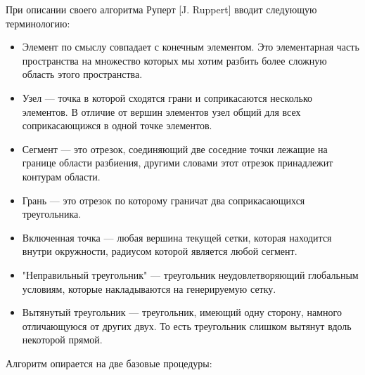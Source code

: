 \documentclass[14pt]{extreport}
\begin{document}
При описании своего алгоритма Руперт [J. Ruppert] вводит следующую терминологию:
\begin{itemize}
\item Элемент по смыслу совпадает с конечным элементом. Это элементарная часть пространства на множество которых мы хотим разбить более сложную область этого пространства.

\item Узел — точка в которой сходятся грани и соприкасаются несколько элементов. В отличие от вершин элементов узел общий для всех соприкасающижся в одной точке элементов.

\item Сегмент — это отрезок, соединяющий две соседние точки лежащие на границе области разбиения, другими словами этот отрезок принадлежит контурам области.

\item Грань — это отрезок по которому граничат два соприкасающихся треугольника.

\item Включенная точка — любая вершина текущей сетки, которая находится внутри окружности, радиусом которой является любой сегмент.

\item "Неправильный треугольник" — треугольник неудовлетворяющий глобальным условиям, которые накладываются на генерируемую сетку.

\item Вытянутый треугольник — треугольник, имеющий одну сторону, намного отличающуюся от других двух. То есть треугольник слишком вытянут вдоль некоторой прямой. 
\end{itemize}

Алгоритм опирается на две базовые процедуры: 
\end{document}
